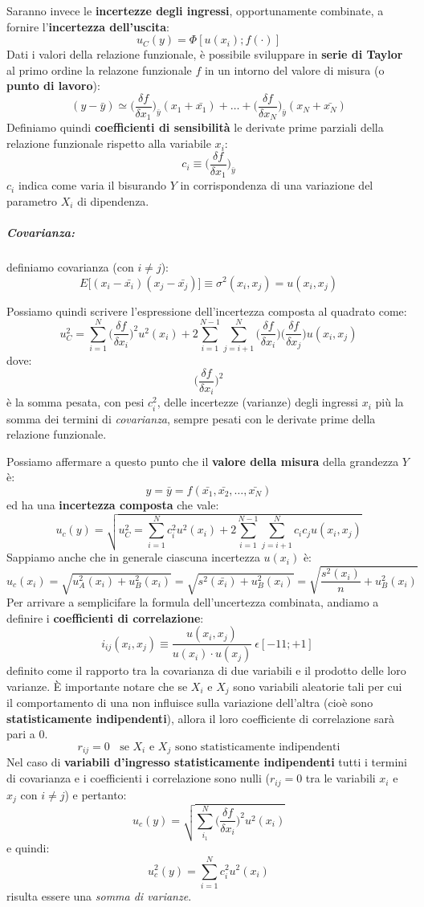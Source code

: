 \documentclass[a4paper,11pt]{report}
\begin{document}
Saranno invece le \textbf{incertezze degli ingressi}, opportunamente combinate, a fornire l'\textbf{incertezza dell'uscita}:
$$
  u_C(y) = \Phi[u(x_i);f(\cdotp)]
$$
Dati i valori della relazione funzionale, è possibile sviluppare in \textbf{serie di Taylor} al primo ordine la relazone funzionale $f$ in un intorno del valore di misura (o \textbf{punto di lavoro}):
$$
  (y-\bar{y}) \simeq \Bigg(\frac{\delta f}{\delta x_1}\Bigg)_{\bar{y}} (x_1 + \bar{x_1})+\ldots+\Bigg(\frac{\delta f}{\delta x_N}\Bigg)_{\bar{y}} (x_N + \bar{x_N}) 
$$
Definiamo quindi \textbf{coefficienti di sensibilità} le derivate prime parziali della relazione funzionale rispetto alla variabile $x_i$:
$$
  c_i \equiv \Bigg(\frac{\delta f}{\delta x_1}\Bigg)_{\bar{y}}
$$
$c_i$ indica come varia il bisurando $Y$ in corrispondenza di una variazione del parametro $X_i$ di dipendenza.
\subparagraph*{Covarianza:} definiamo covarianza (con $i \ne j$):
$$
  E \Bigg[(x_i - \bar{x_i})(x_j - \bar{x_j})\Bigg] \equiv \sigma^2(x_i,x_j) = u (x_i,x_j)
$$

Possiamo quindi scrivere l'espressione dell'incertezza composta al quadrato come:
$$
  u_C^2 = \sum^N_{i = 1}\Bigg(\frac{\delta f}{\delta x_i}\Bigg)^2 u^2(x_i)+2\sum^{N-1}_{i = 1}\sum^{N}_{j = i +1}\Bigg(\frac{\delta f}{\delta x_i}\Bigg)\Bigg(\frac{\delta f}{\delta x_j}\Bigg)u(x_i,x_j)
$$ dove:
$$
  \Bigg(\frac{\delta f}{\delta x_i}\Bigg)^2
$$
è la somma pesata, con pesi $c_i^2$, delle incertezze (varianze) degli ingressi $x_i$ più la somma dei termini di \textit{covarianza}, sempre pesati con le derivate prime della relazione funzionale.

Possiamo affermare a questo punto che il \textbf{valore della misura} della grandezza $Y$ è:
$$
  y = \bar{y} = f(\bar{x_1},\bar{x_2},\ldots,\bar{x_N})
$$ ed ha una \textbf{incertezza composta} che vale:
$$
  u_c(y) = \sqrt{  u_C^2 = \sum^N_{i = 1}c_i^2 u^2(x_i)+2\sum^{N-1}_{i = 1}\sum^{N}_{j = i +1}c_i c_j u(x_i,x_j)}
$$
Sappiamo anche che in generale ciascuna incertezza $u(x_i)$ è:
$$
  u_c(x_i) = \sqrt{u_A^2(x_i)+u_B^2(x_i)} = \sqrt{s^2(\bar{x_i})+u_B^2(x_i)} = \sqrt{\frac{s^2(x_i)}{n}+u_B^2(x_i)}
$$
Per arrivare a semplicifare la formula dell'uncertezza combinata, andiamo a definire i \textbf{coefficienti di correlazione}:
$$
  i_{ij}(x_i,x_j) \equiv \frac{u(x_i,x_j)}{u(x_i)\cdot u(x_j)}~\epsilon [-11;+1]~
$$ definito come il rapporto tra la covarianza di due variabili e il prodotto delle loro varianze. È importante notare che se $X_i$ e $X_j$ sono variabili aleatorie tali per cui il comportamento di una non influisce sulla variazione dell'altra (cioè sono \textbf{statisticamente indipendenti}), allora il loro coefficiente di correlazione sarà pari a 0.
$$
    r_{ij} = 0~~~~\text{se $X_i$ e $X_j$ sono statisticamente indipendenti}
$$
Nel caso di \textbf{variabili d'ingresso statisticamente indipendenti} tutti i termini di covarianza e i coefficienti i correlazione sono nulli ($r_{ij} = 0$ tra le variabili $x_i$ e $x_j$ con $i \neq j$) e pertanto:
$$
  u_c(y) = \sqrt{\sum^{N}_{i_1}\Bigg(\frac{\delta f}{\delta x_i}\Bigg)^2 u^2(x_i)}
$$ e quindi:
$$
  u^2_c(y) = \sum^{N}_{i = 1}c_i^2 u^2 (x_i)
$$ risulta essere una \textit{somma di varianze}.
\end{document}
